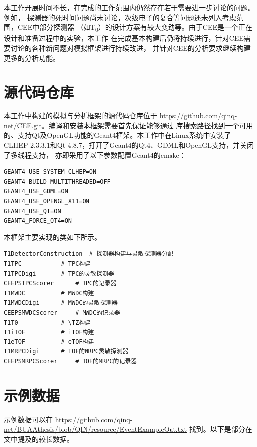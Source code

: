 \documentclass[bachelor,openany,oneside,color]{buaathesis}
\def\TZ{T\textsubscript{0}}
\begin{document}
本工作开展时间不长，在完成的工作范围内仍然存在若干需要进一步讨论的问题。例如，
探测器的死时间问题尚未讨论，次级电子的复合等问题还未列入考虑范围，CEE中部分探测器
（如\TZ）的设计方案有较大变动等。由于CEE是一个正在设计和准备过程中的实验，本工作
在完成基本构建后仍将持续进行，针对CEE需要讨论的各种新问题对模拟框架进行持续改进，
并针对CEE的分析要求继续构建更多的分析功能。



%
\printbibliography[heading=bibintoc,title={参考文献}]

\appendix
\chapter{源代码仓库}\label{chap:repo}
本工作中构建的模拟与分析框架的源代码仓库位于
\url{https://github.com/qinq-net/CEE.git}。编译和安装本框架需要首先保证能够通过
库搜索路径找到一个可用的、支持Qt及OpenGL功能的Geant4框架。本工作中在Linux系统中安装了
CLHEP 2.3.3.1和Qt 4.8.7，打开了Geant4的Qt4、GDML和OpenGL支持，并关闭了多线程支持，
亦即采用了以下参数配置Geant4的cmake：

\begin{lstlisting}[caption={Geant4 编译选项}]
GEANT4_USE_SYSTEM_CLHEP=ON
GEANT4_BUILD_MULTITHREADED=OFF
GEANT4_USE_GDML=ON
GEANT4_USE_OPENGL_X11=ON
GEANT4_USE_QT=ON
GEANT4_FORCE_QT4=ON
\end{lstlisting}

本框架主要实现的类如下所示。

\begin{lstlisting}[caption={主要实现的类}]
T1DetectorConstruction	# 探测器构建与灵敏探测器分配
T1TPC			# TPC构建
T1TPCDigi		# TPC的灵敏探测器
CEEPSTPCScorer		# TPC的记录器
T1MWDC 			# MWDC构建
T1MWDCDigi		# MWDC的灵敏探测器
CEEPSMWDCScorer		# MWDC的记录器
T1T0			# \TZ构建
T1iTOF 			# iTOF构建
T1eTOF 			# eTOF构建
T1MRPCDigi 		# TOF的MRPC灵敏探测器
CEEPSMRPCScorer		# TOF的MRPC的记录器
\end{lstlisting}

\chapter{示例数据}\label{chap:data}

示例数据可以在
{\do{\/}\do{-}
\url{https://github.com/qinq-net/BUAAthesis/blob/QIN/resource/EventExampleOut.txt}
}
找到。以下是部分在文中提及的较长数据。
\end{document}

